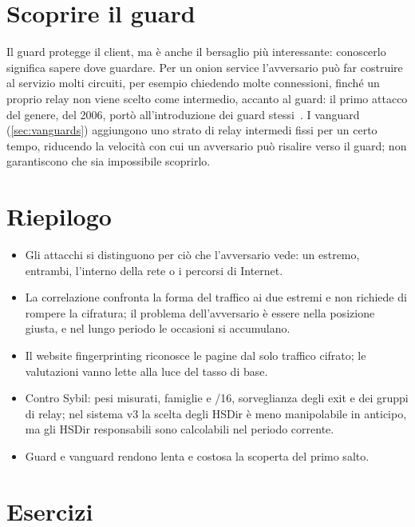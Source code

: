\section{Scoprire il guard}\label{sec:att-guard}

Il guard protegge il client, ma è anche il bersaglio più interessante: conoscerlo significa sapere dove guardare. Per un onion service l'avversario può far costruire al servizio molti circuiti, per esempio chiedendo molte connessioni, finché un proprio relay non viene scelto come intermedio, accanto al guard: il primo attacco del genere, del 2006, portò all'introduzione dei guard stessi~\cite{overlier2006locating}. I vanguard (\cref{sec:vanguards}) aggiungono uno strato di relay intermedi fissi per un certo tempo, riducendo la velocità con cui un avversario può risalire verso il guard; non garantiscono che sia impossibile scoprirlo.

\section*{Riepilogo}
\begin{itemize}
  \item Gli attacchi si distinguono per ciò che l'avversario vede: un estremo, entrambi, l'interno della rete o i percorsi di Internet.
  \item La correlazione confronta la forma del traffico ai due estremi e non richiede di rompere la cifratura; il problema dell'avversario è essere nella posizione giusta, e nel lungo periodo le occasioni si accumulano.
  \item Il website fingerprinting riconosce le pagine dal solo traffico cifrato; le valutazioni vanno lette alla luce del tasso di base.
  \item Contro Sybil: pesi misurati, famiglie e /16, sorveglianza degli exit e dei gruppi di relay; nel sistema v3 la scelta degli HSDir è meno manipolabile in anticipo, ma gli HSDir responsabili sono calcolabili nel periodo corrente.
  \item Guard e vanguard rendono lenta e costosa la scoperta del primo salto.
\end{itemize}

\section*{Esercizi}

